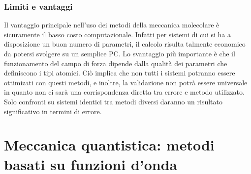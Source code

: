 \documentclass[oneside]{amsbook}
\numberwithin{section}{chapter}
\numberwithin{equation}{section}
\numberwithin{figure}{section}
\begin{document}
\section{Limiti e vantaggi}
Il vantaggio principale nell'uso dei metodi della meccanica molecolare è sicuramente il basso costo computazionale. Infatti per sistemi di cui si ha a disposizione un buon numero di parametri, il calcolo risulta talmente economico da potersi svolgere su un semplice PC.
Lo svantaggio più importante è che il funzionamento del campo di forza dipende dalla qualità dei parametri che definiscono i tipi atomici. Ciò implica che non tutti i sistemi potranno essere ottimizati con questi metodi, e inoltre, la validazione non potrà essere universale in quanto non ci sarà una corrispondenza diretta tra errore e metodo utilizzato. Solo confronti su sistemi identici tra metodi diversi daranno un risultato significativo in termini di errore. 





\part{Meccanica quantistica: metodi basati su funzioni d'onda}
\end{document}
